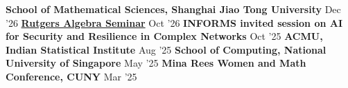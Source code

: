 \resumeProjectHeading
{\textbf{School of Mathematical Sciences, Shanghai Jiao Tong University}}
{\color{grey}Dec '26}
{\resumeItemListStart
{}
\resumeItemListEnd}
\vspace{\gap}
\resumeProjectHeading
{\textbf{\href{https://sites.rutgers.edu/algebr-seminar/current_semester/}{Rutgers Algebra Seminar}}}
{Oct '26}
{\resumeItemListStart
{}
\resumeItemListEnd}
\vspace{\gap}
\resumeProjectHeading
{\textbf{INFORMS invited session on AI for Security and Resilience in Complex Networks}}
{Oct '25}
{\resumeItemListStart
{}
\resumeItemListEnd}
\vspace{\gap}
\resumeProjectHeading
{\textbf{ACMU, Indian Statistical Institute}}
{Aug '25}
{\resumeItemListStart
{}
\resumeItemListEnd}
\vspace{\gap}
\resumeProjectHeading
{\textbf{School of Computing, National University of Singapore}}
{May '25}
{\resumeItemListStart
{}
\resumeItemListEnd}
\vspace{\gap}
\resumeProjectHeading
{\textbf{Mina Rees Women and Math Conference, CUNY}}
{Mar '25}
{\resumeItemListStart
{}
\resumeItemListEnd}
\vspace{\gap}
\resumeSubHeadingListEnd

